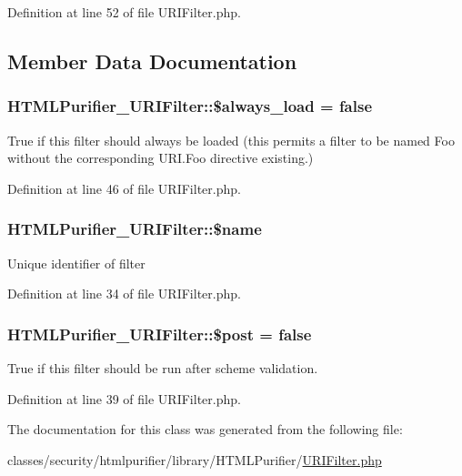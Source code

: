 Definition at line 52 of file U\+R\+I\+Filter.\+php.



\subsection{Member Data Documentation}
\hypertarget{classHTMLPurifier__URIFilter_a003e57f2a66ad11542a7964522ef622a}{
\subsubsection[{\$always\+\_\+load}]{\setlength{\rightskip}{0pt plus 5cm}H\+T\+M\+L\+Purifier\+\_\+\+U\+R\+I\+Filter\+::\$always\+\_\+load = false}}\label{classHTMLPurifier__URIFilter_a003e57f2a66ad11542a7964522ef622a}
True if this filter should always be loaded (this permits a filter to be named Foo without the corresponding U\+R\+I.\+Foo directive existing.) 

Definition at line 46 of file U\+R\+I\+Filter.\+php.

\hypertarget{classHTMLPurifier__URIFilter_a48c492ff331b050dba7a8142e76d3ba1}{
\subsubsection[{\$name}]{\setlength{\rightskip}{0pt plus 5cm}H\+T\+M\+L\+Purifier\+\_\+\+U\+R\+I\+Filter\+::\$name}}\label{classHTMLPurifier__URIFilter_a48c492ff331b050dba7a8142e76d3ba1}
Unique identifier of filter 

Definition at line 34 of file U\+R\+I\+Filter.\+php.

\hypertarget{classHTMLPurifier__URIFilter_a1e2ab0673c51d2ffa4a702279faa3f0d}{
\subsubsection[{\$post}]{\setlength{\rightskip}{0pt plus 5cm}H\+T\+M\+L\+Purifier\+\_\+\+U\+R\+I\+Filter\+::\$post = false}}\label{classHTMLPurifier__URIFilter_a1e2ab0673c51d2ffa4a702279faa3f0d}
True if this filter should be run after scheme validation. 

Definition at line 39 of file U\+R\+I\+Filter.\+php.



The documentation for this class was generated from the following file\+:\begin{DoxyCompactItemize}
\item 
classes/security/htmlpurifier/library/\+H\+T\+M\+L\+Purifier/\hyperlink{URIFilter_8php}{U\+R\+I\+Filter.\+php}\end{DoxyCompactItemize}
